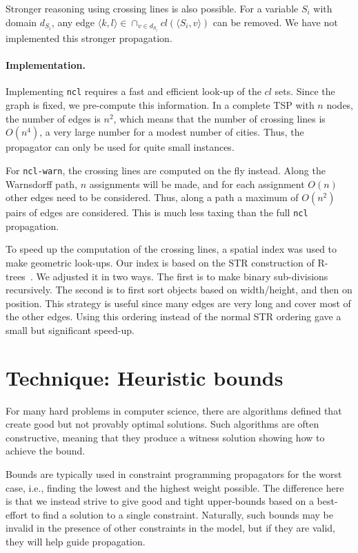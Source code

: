 \documentclass[runningheads]{llncs}
\newcommand{\cons}[1]{\texttt{#1}}
\begin{document}
Stronger reasoning using crossing lines is also possible. For a
variable $S_i$ with domain $d_{S_i}$, any edge $\langle
k,l \rangle\in\cap_{v\in d_{S_i}} cl(\langle S_i, v \rangle)$ can be
removed. We have not implemented this stronger propagation. 

\label{sec:ncl-impl}

\paragraph{Implementation.} Implementing \cons{ncl} requires a fast and efficient look-up of the
$cl$ sets. Since the graph is fixed, we pre-compute this information.
In a complete TSP with $n$ nodes, the number of edges is $n^2$, which
means that the number of crossing lines is $O\left(n^4\right)$, a very large
number for a modest number of cities. Thus, the propagator can only be
used for quite small instances.

For \cons{ncl-warn}, the crossing lines are computed on the fly
instead. Along the Warnsdorff path, $n$ assignments will be made, and
for each assignment $O(n)$ other edges need to be considered. Thus,
along a path a maximum of $O(n^2)$ pairs of edges are considered. This
is much less taxing than the full \cons{ncl} propagation.

To speed up the computation of the crossing lines, a spatial
index was used to make geometric look-ups. Our index is based on the
STR construction of R-trees~\cite{STR}. We adjusted it in two
ways. The first is to make binary sub-divisions recursively. The
second is to first sort objects based on width/height, and then on
position. This strategy is useful since many edges are very long and
cover most of the other edges. Using this ordering instead of the
normal STR ordering gave a small but significant speed-up.

\section{Technique: Heuristic bounds}
\label{sec:hf-examples:bounds}

For many hard problems in computer science, there are algorithms
defined that create good but not provably optimal solutions. Such
algorithms are often constructive, meaning that they produce a witness
solution showing how to achieve the bound.

Bounds are typically used in constraint programming propagators for
the worst case, i.e., finding the lowest and the highest weight
possible. The difference here is that we instead strive to give good
and tight upper-bounds based on a best-effort to find a solution to a
single constraint. Naturally, such bounds may be invalid in the
presence of other constraints in the model, but if they are valid,
they will help guide propagation.
\end{document}
